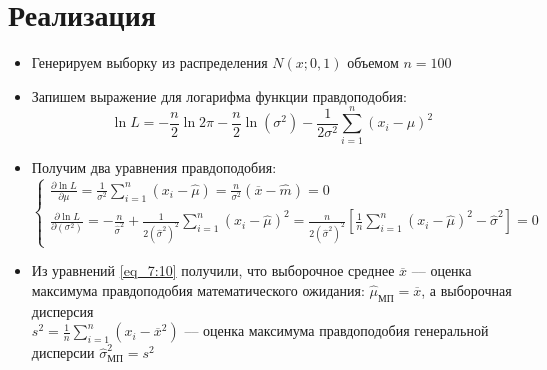 \documentclass[12pt]{article}
\begin{document}
\section*{Реализация}
\begin{itemize}
    \item Генерируем выборку из распределения $N(x; 0, 1)$ объемом $n = 100$ 
    \item Запишем выражение для логарифма функции правдоподобия:
    \begin{equation}
    	\ln L = -\frac{n}{2} \ln 2\pi - \frac{n}{2} \ln(\sigma^2) - \frac{1}{2\sigma^2}\sum_{i=1}^{n}(x_i - \mu)^2
    	\label{eq_7:9}
    \end{equation}
    \item Получим два уравнения правдоподобия:
    \begin{equation}
    	\begin{cases}
    		\displaystyle \frac{\partial \ln L}{\partial \mu} = \frac{1}{\sigma^2}\sum_{i=1}^{n}(x_i - \hat \mu) = \frac{n}{\sigma^2}(\overline x - \hat m) = 0 \\
    		\displaystyle \frac{\partial \ln L}{\partial(\sigma^2)} = -\frac{n}{\hat \sigma^2} + \frac{1}{2(\hat \sigma^2)^2} \sum_{i=1}^{n}(x_i - \hat \mu)^2 = \frac{n}{2(\hat \sigma^2)^2} \left[\frac{1}{n} \sum_{i=1}^{n}(x_i - \hat \mu)^2 - \hat \sigma^2 \right] = 0
    	\end{cases}
    	\label{eq_7:10}
    \end{equation}
    \item Из уравнений \eqref{eq_7:10} получили, что выборочное среднее $\overline x$ –– оценка максимума правдоподобия математического ожидания: $\hat \mu_{\text{МП}} = \overline x$, а выборочная дисперсия \\ $s^2 = \frac{1}{n}\sum_{i=1}^{n}(x_i - \overline x^2)$ –– оценка максимума правдоподобия генеральной дисперсии $\hat \sigma^2_{\text{МП}} = s^2$
\end{itemize}
\end{document}
